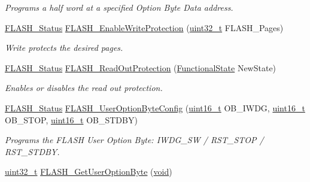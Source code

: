 \begin{DoxyCompactItemize}
\begin{DoxyCompactList}\small\item\em Programs a half word at a specified Option Byte Data address. \end{DoxyCompactList}\item 
\hyperlink{group___f_l_a_s_h___exported___types_gadc63a6f3404ff1f71229a66915e9cdc0}{F\+L\+A\+S\+H\+\_\+\+Status} \hyperlink{group___f_l_a_s_h___private___functions_gabad10c15e2d1ff1cb9e1083d08a9e763}{F\+L\+A\+S\+H\+\_\+\+Enable\+Write\+Protection} (\hyperlink{_p_e___types_8h_a33594304e786b158f3fb30289278f5af}{uint32\+\_\+t} F\+L\+A\+S\+H\+\_\+\+Pages)
\begin{DoxyCompactList}\small\item\em Write protects the desired pages. \end{DoxyCompactList}\item 
\hyperlink{group___f_l_a_s_h___exported___types_gadc63a6f3404ff1f71229a66915e9cdc0}{F\+L\+A\+S\+H\+\_\+\+Status} \hyperlink{group___f_l_a_s_h___private___functions_ga0b8d1a8277950c890bbc247bbeafb40f}{F\+L\+A\+S\+H\+\_\+\+Read\+Out\+Protection} (\hyperlink{agilefox_2library_2inc_2stm32f10x__type_8h_ac9a7e9a35d2513ec15c3b537aaa4fba1}{Functional\+State} New\+State)
\begin{DoxyCompactList}\small\item\em Enables or disables the read out protection. \end{DoxyCompactList}\item 
\hyperlink{group___f_l_a_s_h___exported___types_gadc63a6f3404ff1f71229a66915e9cdc0}{F\+L\+A\+S\+H\+\_\+\+Status} \hyperlink{group___f_l_a_s_h___private___functions_gaae1c493bb06c930ceb84dedfdb7325f6}{F\+L\+A\+S\+H\+\_\+\+User\+Option\+Byte\+Config} (\hyperlink{_p_e___types_8h_a1f1825b69244eb3ad2c7165ddc99c956}{uint16\+\_\+t} O\+B\+\_\+\+I\+W\+DG, \hyperlink{_p_e___types_8h_a1f1825b69244eb3ad2c7165ddc99c956}{uint16\+\_\+t} O\+B\+\_\+\+S\+T\+OP, \hyperlink{_p_e___types_8h_a1f1825b69244eb3ad2c7165ddc99c956}{uint16\+\_\+t} O\+B\+\_\+\+S\+T\+D\+BY)
\begin{DoxyCompactList}\small\item\em Programs the F\+L\+A\+SH User Option Byte\+: I\+W\+D\+G\+\_\+\+SW / R\+S\+T\+\_\+\+S\+T\+OP / R\+S\+T\+\_\+\+S\+T\+D\+BY. \end{DoxyCompactList}\item 
\hyperlink{_p_e___types_8h_a33594304e786b158f3fb30289278f5af}{uint32\+\_\+t} \hyperlink{group___f_l_a_s_h___private___functions_ga31441647fac5fbb38369613076737943}{F\+L\+A\+S\+H\+\_\+\+Get\+User\+Option\+Byte} (\hyperlink{usb__devapi_8h_afabf60e7f57651d6d595a02c75f07cd0}{void})

\end{DoxyCompactItemize}
